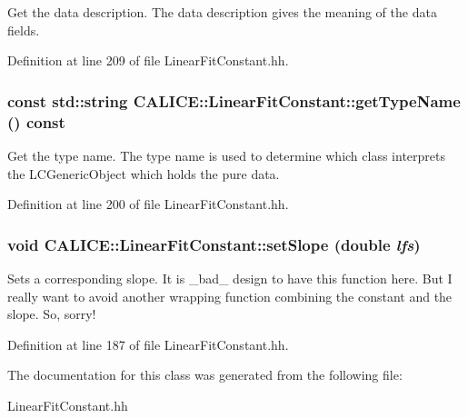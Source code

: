 Get the data description. The data description gives the meaning of the data fields. 

Definition at line 209 of file LinearFitConstant.hh.
\subsubsection[{getTypeName}]{\setlength{\rightskip}{0pt plus 5cm}const std::string CALICE::LinearFitConstant::getTypeName () const\hspace{0.3cm}{\ttfamily  [inline]}}\label{classCALICE_1_1LinearFitConstant_a1929abfb9351d5273fed48ab3609c1c8}


Get the type name. The type name is used to determine which class interprets the LCGenericObject which holds the pure data. 

Definition at line 200 of file LinearFitConstant.hh.
\subsubsection[{setSlope}]{\setlength{\rightskip}{0pt plus 5cm}void CALICE::LinearFitConstant::setSlope (double {\em lfs})\hspace{0.3cm}{\ttfamily  [inline]}}\label{classCALICE_1_1LinearFitConstant_ad2b647ad849fd025df318e9722d3673d}


Sets a corresponding slope. It is \_\-bad\_\- design to have this function here. But I really want to avoid another wrapping function combining the constant and the slope. So, sorry! 

Definition at line 187 of file LinearFitConstant.hh.

The documentation for this class was generated from the following file:\begin{DoxyCompactItemize}
\item 
LinearFitConstant.hh\end{DoxyCompactItemize}

